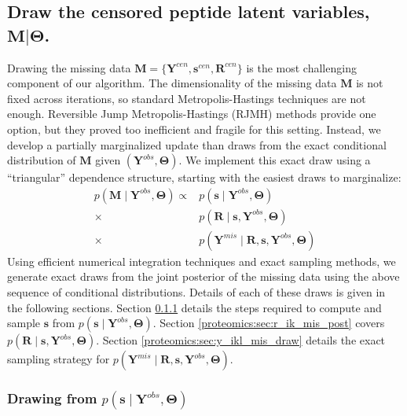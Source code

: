 \subsection{Draw the censored peptide latent variables, $\mathbf{M} \vert \bm \Theta$.}
\label{proteomics:sec:missingDataDraw}

Drawing the missing data $\mathbf{M}=\{\mathbf{Y}^{cen},\mathbf{s}^{cen},\mathbf{R}^{cen}\}$ is the most challenging component of our algorithm.
The dimensionality of the missing data $\mathbf{M}$ is not fixed across iterations, so standard Metropolis-Hastings techniques are not enough.
Reversible Jump Metropolis-Hastings (RJMH) methods provide one option, but they proved too inefficient and fragile for this setting.
Instead, we develop a partially marginalized update than draws from the exact conditional distribution of $\bm M$ given $(\bm Y^{obs}, \bm \Theta)$.
We implement this exact draw using a ``triangular'' dependence structure, starting with the easiest draws to marginalize:
%
\begin{align}
p( \bm M \mid \bm{Y}^{obs}, \bm{\Theta}) \propto & p(\bm s \mid \bm {Y}^{obs}, \bm{\Theta}) \\
\nonumber
 \times & p(\bm{R} \mid \bm s, \bm{Y}^{obs}, \bm{\Theta}) \\
\nonumber
 \times & p(\bm{Y}^{mis} \mid \bm{R}, \bm{s}, \bm{Y}^{obs}, \bm{\Theta})
\end{align}
%
Using efficient numerical integration techniques and exact sampling methods, we generate exact draws from the joint posterior of the missing data using the above sequence of conditional distributions.
Details of each of these draws is given in the following sections.
Section \ref{proteomics:sc:draw_s_ik_mis} details the steps required to compute and sample $\bm s$ from $p(\bm s \mid \bm {Y}^{obs}, \bm{\Theta})$.
Section \ref{proteomics:sec:r_ik_mis_post} covers $p(\bm{R} \mid \bm s, \bm{Y}^{obs}, \bm{\Theta})$.
Section \ref{proteomics:sec:y_ikl_mis_draw} details the exact sampling strategy for $p(\bm{Y}^{mis} \mid \bm{R}, \bm{s}, \bm{Y}^{obs}, \bm{\Theta})$.

\subsubsection{Drawing from $p(\bm s \mid \bm {Y}^{obs}, \bm{\Theta})$} \label{proteomics:sc:draw_s_ik_mis} 

